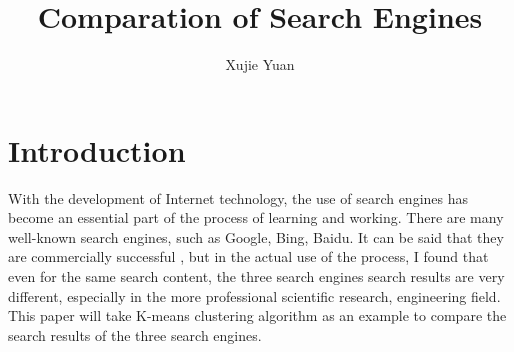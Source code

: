 \documentclass{article}
\title{Comparation of Search Engines}
\author{Xujie Yuan}
\begin{document}
    \maketitle
    \section{Introduction}
    With the development of Internet technology, the use of search engines has become an essential part of the process of learning and working. There are many well-known search engines, such as Google, Bing, Baidu. It can be said that they are commercially successful \cite{ghose2014examining}, but in the actual use of the process, I found that even for the same search content, the three search engines search results are very different, especially in the more professional scientific research, engineering field. This paper will take K-means clustering algorithm as an example to compare the search results of the three search engines.
\end{document}
